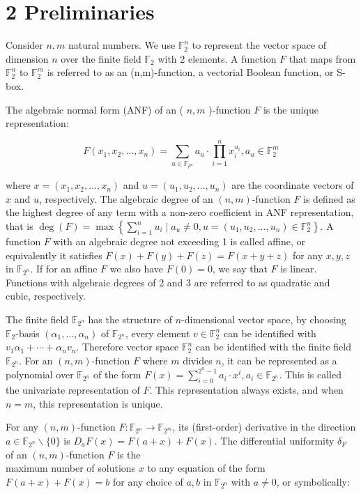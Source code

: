 \documentclass[10pt]{article}
\begin{document}
\section*{2 Preliminaries}
Consider $n, m$ natural numbers. We use $\mathbb{F}_{2}^{n}$ to represent the vector space of dimension $n$ over the finite field $\mathbb{F}_{2}$ with 2 elements. A function $F$ that maps from $\mathbb{F}_{2}^{n}$ to $\mathbb{F}_{2}^{m}$ is referred to as an (n,m)-function, a vectorial Boolean function, or S-box.

The algebraic normal form (ANF) of an ( $n, m$ )-function $F$ is the unique representation:

$$
F\left(x_{1}, x_{2}, \ldots, x_{n}\right)=\sum_{u \in \mathbb{F}_{p^{n}}} a_{u} \cdot \prod_{i=1}^{n} x_{i}^{u_{i}}, a_{u} \in \mathbb{F}_{2}^{m}
$$

where $x=\left(x_{1}, x_{2}, \ldots, x_{n}\right)$ and $u=\left(u_{1}, u_{2}, \ldots, u_{n}\right)$ are the coordinate vectors of $x$ and $u$, respectively. The algebraic degree of an $(n, m)$-function $F$ is defined as the highest degree of any term with a non-zero coefficient in ANF representation, that is $\operatorname{deg}(F)=\max \left\{\sum_{i=1}^{n} u_{i} \mid a_{u} \neq 0, u=\right. \left.\left(u_{1}, u_{2}, \ldots, u_{n}\right) \in \mathbb{F}_{2}^{n}\right\}$. A function $F$ with an algebraic degree not exceeding 1 is called affine, or equivalently it satisfies $F(x)+F(y)+F(z)=F(x+y+z)$ for any $x, y, z$ in $\mathbb{F}_{2^{n}}$. If for an affine $F$ we also have $F(0)=0$, we say that $F$ is linear. Functions with algebraic degrees of 2 and 3 are referred to as quadratic and cubic, respectively.

The finite field $\mathbb{F}_{2^{n}}$ has the structure of $n$-dimensional vector space, by choosing $\mathbb{F}_{2}$-basis $\left(\alpha_{1}, \ldots, \alpha_{n}\right)$ of $\mathbb{F}_{2^{n}}$, every element $v \in \mathbb{F}_{2}^{n}$ can be identified with $v_{1} \alpha_{1}+\cdots+\alpha_{n} v_{n}$. Therefore vector space $\mathbb{F}_{2}^{n}$ can be identified with the finite field $\mathbb{F}_{2^{n}}$. For an $(n, m)$-function $F$ where $m$ divides $n$, it can be represented as a polynomial over $\mathbb{F}_{2^{n}}$ of the form $F(x)=\sum_{i=0}^{2^{n}-1} a_{i} \cdot x^{i}, a_{i} \in \mathbb{F}_{2^{n}}$. This is called the univariate representation of $F$. This representation always exists, and when $n=m$, this representation is unique.

For any $(n, m)$-function $F: \mathbb{F}_{2^{n}} \rightarrow \mathbb{F}_{2^{m}}$, its (first-order) derivative in the direction $a \in \mathbb{F}_{2^{n}} \backslash\{0\}$ is $D_{a} F(x)=F(a+x)+F(x)$. The differential uniformity $\delta_{F}$ of an $(n, m)$-function $F$ is the\\
maximum number of solutions $x$ to any equation of the form $F(a+x)+F(x)=b$ for any choice of $a, b$ in $\mathbb{F}_{2^{n}}$ with $a \neq 0$, or symbolically:
\end{document}
